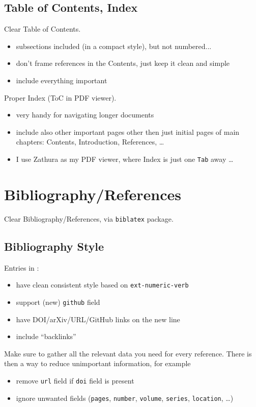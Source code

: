 \subsection{Table of Contents, Index}%
\label{sub:Table of Contents and Index}

Clear Table of Contents.
\begin{itemize}
    \item subsections included (in a compact style), but not numbered...
    \item don't frame references in the Contents, just keep it clean and simple
    \item include everything important
\end{itemize}

Proper Index (ToC in PDF viewer).
\begin{itemize}
    \item very handy for navigating longer documents
    \item include also other important pages other then just initial pages of main chapters: Contents, Introduction, References, \ldots
    \item I use Zathura as my PDF viewer, where Index is just one \texttt{Tab} away \ldots
\end{itemize}


\section{Bibliography/References}%
\label{sec:Bibliography/References}

Clear Bibliography/References, via \texttt{biblatex} package.

\subsection{Bibliography Style}%
\label{sub:Bibliography Style}

Entries in :
\begin{itemize}
    \item have clean consistent style based on \texttt{ext-numeric-verb}
    \item support (new) \texttt{github} field
    \item have DOI/arXiv/URL/GitHub links on the new line
    \item include \enquote{backlinks}
\end{itemize}

\begin{Note}
    Make sure to gather all the relevant data you need for every reference. There is then a way to reduce unimportant information, for example
    \begin{itemize}
        \item remove \texttt{url} field if \texttt{doi} field is present
        \item ignore unwanted fields (\texttt{pages}, \texttt{number}, \texttt{volume}, \texttt{series}, \texttt{location}, \ldots)
    \end{itemize}
\end{Note}

